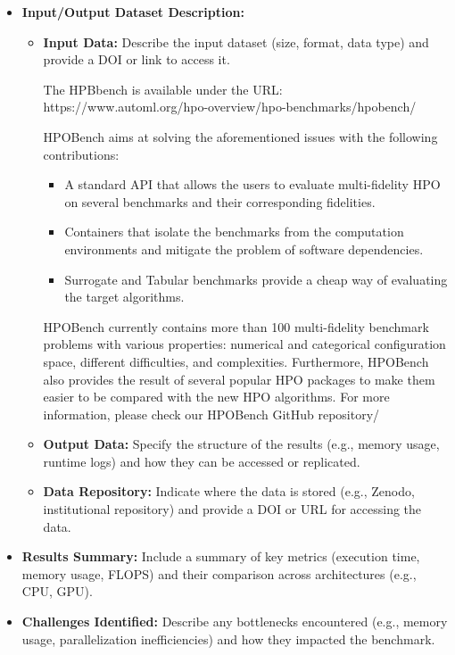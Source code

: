 \begin{itemize}
\item \textbf{Input/Output Dataset Description:}
\begin{itemize}

\item \textbf{Input Data:} Describe the input dataset (size, format, data type) and provide a DOI or link to access it.

The HPBbench is available under the URL: https://www.automl.org/hpo-overview/hpo-benchmarks/hpobench/

HPOBench aims at solving the aforementioned issues with the following contributions:

\begin{itemize}
\item A standard API that allows the users to evaluate multi-fidelity HPO on several benchmarks and their corresponding fidelities.
\item Containers that isolate the benchmarks from the computation environments and mitigate the problem of software dependencies.
\item Surrogate and Tabular benchmarks provide a cheap way of evaluating the target algorithms.
\end{itemize}

HPOBench currently contains more than 100 multi-fidelity benchmark problems with various properties: numerical and categorical configuration space, different difficulties, and complexities. Furthermore, HPOBench also provides the result of several popular HPO packages to make them easier to be compared with the new HPO algorithms. For more information, please check our HPOBench GitHub repository/

\item \textbf{Output Data:} Specify the structure of the results (e.g., memory usage, runtime logs) and how they can be accessed or replicated.

\item \textbf{Data Repository:} Indicate where the data is stored (e.g., Zenodo, institutional repository) and provide a DOI or URL for accessing the data.
\end{itemize}

\item \textbf{Results Summary:} Include a summary of key metrics (execution time, memory usage, FLOPS) and their comparison across architectures (e.g., CPU, GPU).

\item \textbf{Challenges Identified:} Describe any bottlenecks encountered (e.g., memory usage, parallelization inefficiencies) and how they impacted the benchmark.
\end{itemize}

